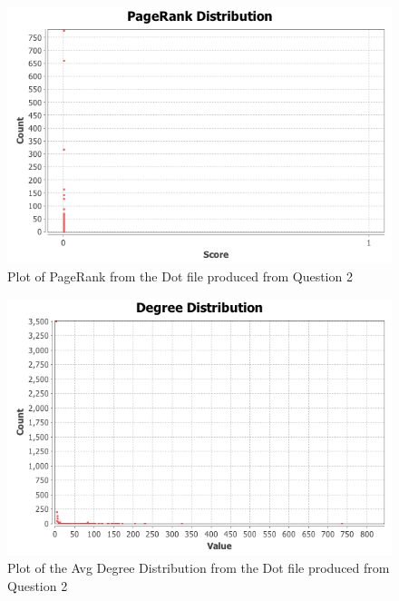 \documentclass[letterpaper,11pt]{article}
\begin{document}
\begin{figure}[p]
\includegraphics[scale=0.5]{q3/PageRank/pageranks.png}
\caption{Plot of PageRank from the Dot file produced from Question 2}
\label{fig:q3pagerank}
\end{figure}

\begin{figure}[p]
\includegraphics[scale=0.5]{q3/Avg-Degree/degree-distribution.png}
\caption{Plot of the Avg Degree Distribution from the Dot file produced from Question 2}
\label{fig:q3avgdegree-distribution}
\end{figure}
\end{document}
